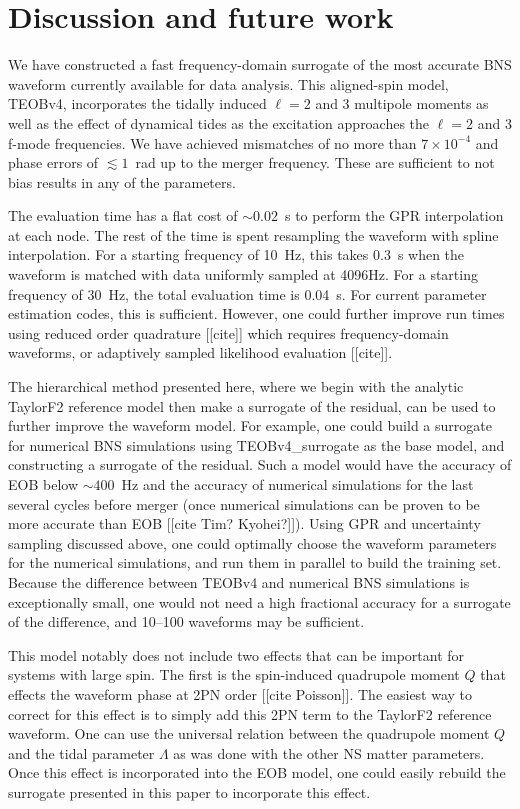 \documentclass[prd,aps,letter,twocolumn,floatfix,notitlepage,nofootinbib]{revtex4-1}
\begin{document}
\section{Discussion and future work}

We have constructed a fast frequency-domain surrogate of the most accurate BNS waveform currently available for data analysis. This aligned-spin model, TEOBv4, incorporates the tidally induced $\ell=2$ and 3 multipole moments as well as the effect of dynamical tides as the excitation approaches the $\ell=2$ and 3 f-mode frequencies. We have achieved mismatches of no more than $7 \times 10^{-4}$ and phase errors of $\lesssim 1$~rad up to the merger frequency. These are sufficient to not bias results in any of the parameters.

The evaluation time has a flat cost of $\sim 0.02$~s to perform the GPR interpolation at each node. The rest of the time is spent resampling the waveform with spline interpolation. For a starting frequency of 10~Hz, this takes 0.3~s when the waveform is matched with data uniformly sampled at 4096Hz. For a starting frequency of 30~Hz, the total evaluation time is 0.04~s. For current parameter estimation codes, this is sufficient. However, one could further improve run times using reduced order quadrature [[cite]] which requires frequency-domain waveforms, or adaptively sampled likelihood evaluation [[cite]].

The hierarchical method presented here, where we begin with the analytic TaylorF2 reference model then make a surrogate of the residual, can be used to further improve the waveform model. For example, one could build a surrogate for numerical BNS simulations using TEOBv4\_surrogate as the base model, and constructing a surrogate of the residual. Such a model would have the accuracy of EOB below $\sim 400$~Hz and the accuracy of numerical simulations for the last several cycles before merger (once numerical simulations can be proven to be more accurate than EOB [[cite Tim? Kyohei?]]). Using GPR and uncertainty sampling discussed above, one could optimally choose the waveform parameters for the numerical simulations, and run them in parallel to build the training set. Because the difference between TEOBv4 and numerical BNS simulations is exceptionally small, one would not need a high fractional accuracy for a surrogate of the difference, and 10--100 waveforms may be sufficient.

This model notably does not include two effects that can be important for systems with large spin. The first is the spin-induced quadrupole moment $Q$ that effects the waveform phase at 2PN order [[cite Poisson]]. The easiest way to correct for this effect is to simply add this 2PN term to the TaylorF2 reference waveform. One can use the universal relation between the quadrupole moment $Q$ and the tidal parameter $\Lambda$ as was done with the other NS matter parameters. Once this effect is incorporated into the EOB model, one could easily rebuild the surrogate presented in this paper to incorporate this effect.
\end{document}
